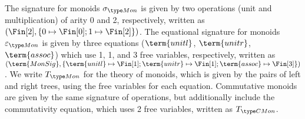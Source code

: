 \documentclass{article}
\begin{document}
The signature for monoids $\sigma_{\Mon}$ is given by two operations (unit and multiplication) of arity 0 and 2,
respectively, written as $(\Fin[2],\{0 \mapsto \Fin[0]; 1 \mapsto \Fin[2]\})$.
%
The equational signature for monoids $\varepsilon_{\Mon}$ is given by three equations
($\term{unitl}$, $\term{unitr}$, $\term{assoc}$) which use 1, 1, and 3 free variables, respectively,
written as
$(\term{MonSig},\{\term{unitl} \mapsto \Fin[1]; \term{unitr} \mapsto \Fin[1]; \term{assoc} \mapsto \Fin[3]\})$.
%
We write $T_{\Mon}$ for the theory of monoids, which is given by the pairs of left and right trees,
using the free variables for each equation.
%
Commutative monoids are given by the same signature of operations,
but additionally include the commutativity equation, which uses 2 free variables, written as $T_{\CMon}$.
\end{document}
